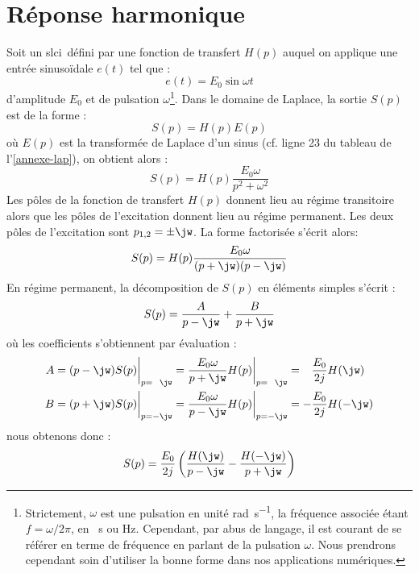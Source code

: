 \section{Réponse harmonique}
Soit un \gls{slci}~défini par une fonction de transfert $H(p)$ auquel on 
applique une entrée sinuso\"idale $e(t)$ tel que :
\[
e(t)=E_0\sin\omega t 
\]
d'amplitude $E_0$ et de pulsation $\omega$\footnote{Strictement, $\omega$ est 
une pulsation en unité \si{\radian\per\second}, la fréquence associée étant 
$f=\omega/2\pi$, en \si{\per\second} ou \si{\hertz}. Cependant, par abus de 
langage, il est courant de se référer en terme de fréquence en parlant de la 
pulsation $\omega$. Nous prendrons cependant soin d'utiliser la bonne forme 
dans nos applications numériques.}. Dans le domaine de Laplace, la sortie $S(p)$
est de la forme :
\[
S(p)=H(p)E(p)
\]
où $E(p)$ est la transformée de Laplace d'un sinus (cf. ligne 23 du tableau de 
l'\cref{annexe-lap}), on obtient alors :
\[
S(p)=H(p)\dfrac{E_0\omega}{p^2+\omega^2}
\]
Les pôles de la fonction de transfert $H(p)$ donnent lieu au 
régime transitoire alors que les pôles de l'excitation donnent 
lieu au régime permanent. 
Les deux pôles de l'excitation sont $p_{1,2}=\pm\jw$. La forme factorisée 
s'écrit alors:
\[
S(p)=H(p)\dfrac{E_0\omega}{(p+\jw)(p-\jw)}
\]
En régime permanent, la décomposition de $S(p)$ en éléments simples s'écrit :
\[
S(p)=\dfrac{A}{p-\jw} + \dfrac{B}{p+\jw}
\]
où les coefficients s'obtiennent par évaluation :
\begin{align*}
    A&=(p-\jw)S(p)\bigg|_{p=\hphantom{-}\jw}=
       \dfrac{E_0\omega}{p+\jw}H(p)\bigg|_{p=\hphantom{-}\jw}=
       \hphantom{-}\dfrac{E_0}{2j}H(\jw)\\
    B&=(p+\jw)S(p)\bigg|_{p=-\jw}=
       \dfrac{E_0\omega}{p-\jw}H(p)\bigg|_{p=-\jw}=
       -\dfrac{E_0}{2j}H(-\jw)
\end{align*}
nous obtenons donc :
\[
S(p)=\dfrac{E_0}{2j}\left(\dfrac{H(\jw)}{p-\jw}-\dfrac{H(-\jw)}{p+\jw} \right)
\]
